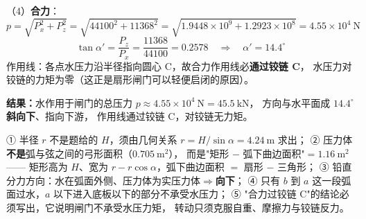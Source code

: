 \begin{jie}
（4）\textbf{合力}：
\[ p=\sqrt{P_x^2+P_z^2}=\sqrt{44100^2+11368^2}=\sqrt{1.9448\times10^9+1.2923\times10^8}
=4.55\times10^4\ \mathrm{N} \]
\[ \tan\alpha'=\frac{P_z}{P_x}=\frac{11368}{44100}=0.2578\quad\Rightarrow\quad
\alpha'=14.4^{\circ} \]
作用线：各点水压力沿半径指向圆心 C，故合力作用线必\textbf{通过铰链 C}，
水压力对铰链的力矩为零（这正是扇形闸门可以轻便启闭的原因）。

\textbf{结果：}水作用于闸门的总压力 $p\approx4.55\times10^4\ \mathrm{N}=45.5\ \mathrm{kN}$，
方向与水平面成 $14.4^{\circ}$ \textbf{斜向下}、指向下游，
作用线通过铰链 C，对铰链无力矩。
\end{jie}

\begin{yicuo}
① 半径 $r$ 不是题给的 $H$，须由几何关系 $r=H/\sin\alpha=4.24\ \mathrm{m}$ 求出；
② 压力体\textbf{不是}弧与弦之间的弓形面积（$0.705\ \mathrm{m^2}$），
而是"矩形 $-$ 弧下曲边面积"$=1.16\ \mathrm{m^2}$——
矩形高为 $H$、宽为 $r-r\cos\alpha$，弧下曲边面积 $=$ 扇形 $-$ 三角形；
③ 铅直分力方向：水在弧面外侧、压力体为实压力体$\Rightarrow$\textbf{向下}；
④ 只有 $b$ 到 $a$ 这一段弧面过水，$a$ 以下进入底板以下的部分不承受水压力；
⑤ "合力过铰链 C"的结论必须写出，它说明闸门不承受水压力矩，
转动只须克服自重、摩擦力与铰链反力。
\end{yicuo}
